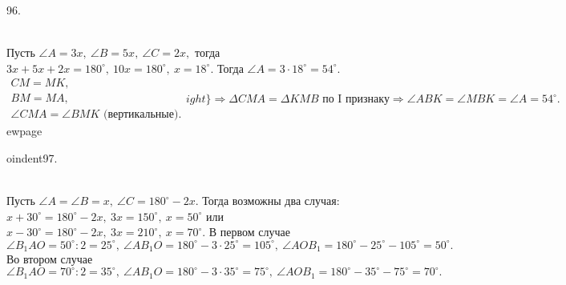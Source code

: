 96. \begin{figure}[ht!]
\end{figure}\\
Пусть $\angle A=3x,\ \angle B=5x,\ \angle C=2x,$ тогда $3x+5x+2x=180^\circ,\ 10x=180^\circ,\ x=18^\circ.$ Тогда $\angle A=3\cdot18^\circ=54^\circ.$
$\left.\begin{array}{l}CM=MK,\\
BM=MA,\\
\angle CMA=\angle BMK\text{ (вертикальные).}\end{array}
ight\}\Rightarrow \Delta CMA=\Delta KMB\text{ по I признаку}\Rightarrow \angle ABK=\angle MBK=\angle A=54^\circ.$
ewpage

oindent97. \begin{figure}[ht!]
\end{figure}\\
Пусть $\angle A=\angle B=x,\ \angle C=180^\circ-2x.$ Тогда возможны два случая: $x+30^\circ=180^\circ-2x,\ 3x=150^\circ,\ x=50^\circ$ или $x-30^\circ=180^\circ-2x,\
3x=210^\circ,\ x=70^\circ.$ В первом случае  $\angle B_1AO=50^\circ:2=25^\circ,\ \angle AB_1O=180^\circ-3\cdot25^\circ=105^\circ,\ \angle AOB_1=180^\circ-25^\circ-105^\circ=50^\circ.$ Во втором случае  $\angle B_1AO=70^\circ:2=35^\circ,\ \angle AB_1O=180^\circ-3\cdot35^\circ=75^\circ,\ \angle AOB_1=180^\circ-35^\circ-75^\circ=70^\circ.$\\
